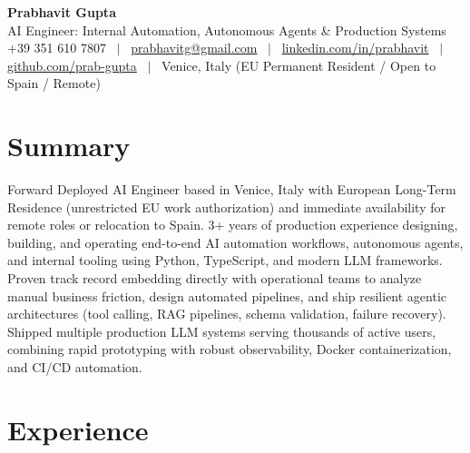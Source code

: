 \documentclass[a4paper,10pt]{article}
\begin{document}
\begin{minipage}[c]{0.80\textwidth}
 {\Huge\bfseries Prabhavit Gupta}\\[3pt]
 {\color{accent}\large AI Engineer: Internal Automation, Autonomous Agents \& Production Systems}\\[6pt]
 {\footnotesize +39 351 610 7807 ~$\vert$~
 \href{mailto:prabhavitg@gmail.com}{prabhavitg@gmail.com} ~$\vert$~
 \href{https://www.linkedin.com/in/prabhavit/}{linkedin.com/in/prabhavit} ~$\vert$~
 \href{https://github.com/prab-gupta}{github.com/prab-gupta} ~$\vert$~
 Venice, Italy (EU Permanent Resident / Open to Spain / Remote)}
\end{minipage}\hfill

\section{Summary}
Forward Deployed AI Engineer based in Venice, Italy with European Long-Term Residence (unrestricted EU work authorization) and immediate availability for remote roles or relocation to Spain. 3+ years of production experience designing, building, and operating end-to-end AI automation workflows, autonomous agents, and internal tooling using Python, TypeScript, and modern LLM frameworks. Proven track record embedding directly with operational teams to analyze manual business friction, design automated pipelines, and ship resilient agentic architectures (tool calling, RAG pipelines, schema validation, failure recovery). Shipped multiple production LLM systems serving thousands of active users, combining rapid prototyping with robust observability, Docker containerization, and CI/CD automation.

\section{Experience}
\end{document}
